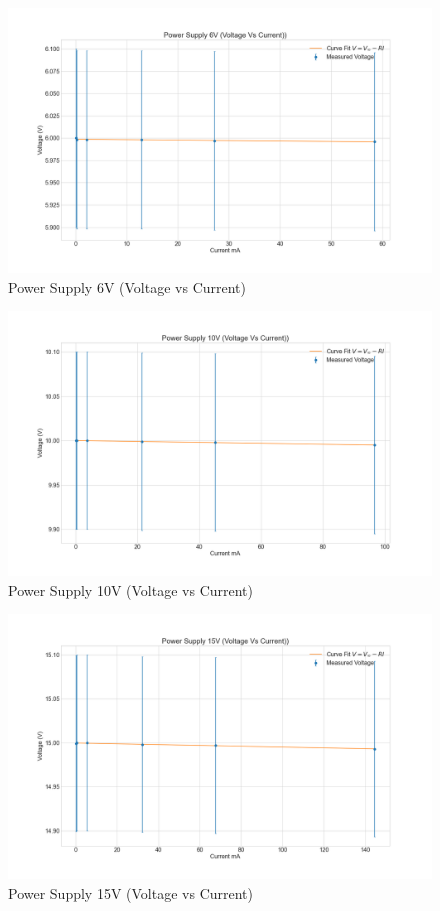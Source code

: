 \documentclass[letterpaper,12pt]{article}
\begin{document}
\begin{figure}[H]
  \centering
  \includegraphics[width=0.95\linewidth]{../code/Fredrik/Power supply 6V lab5_voltage_vs_current.png}    
  \caption{Power Supply 6V (Voltage vs Current)}
  \label{ps-6}
\end{figure}

\begin{figure}[H]
  \centering
  \includegraphics[width=0.95\linewidth]{../code/Fredrik/Power supply 10V lab5_voltage_vs_current.png}    
  \caption{Power Supply 10V (Voltage vs Current)}
  \label{ps-10}
\end{figure}

\begin{figure}[H]
  \centering
  \includegraphics[width=0.95\linewidth]{../code/Fredrik/Power supply 15V lab5_voltage_vs_current.png}    
  \caption{Power Supply 15V (Voltage vs Current)}
  \label{ps-15}
\end{figure}
\end{document}
